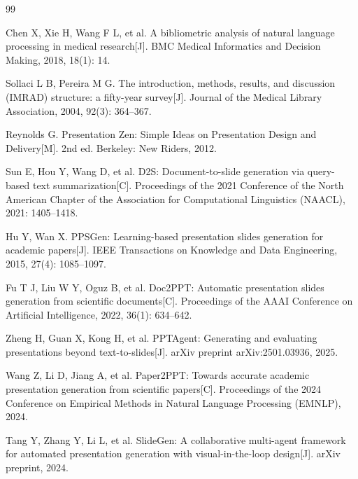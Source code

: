 
\begin{thebibliography}{99}

    Chen X, Xie H, Wang F L, et al.
    A bibliometric analysis of natural language processing in medical research[J].
    BMC Medical Informatics and Decision Making, 2018, 18(1): 14.

    Sollaci L B, Pereira M G.
    The introduction, methods, results, and discussion (IMRAD) structure: a fifty-year survey[J].
    Journal of the Medical Library Association, 2004, 92(3): 364--367.

    Reynolds G.
    Presentation Zen: Simple Ideas on Presentation Design and Delivery[M].
    2nd ed. Berkeley: New Riders, 2012.

    Sun E, Hou Y, Wang D, et al.
    D2S: Document-to-slide generation via query-based text summarization[C].
    Proceedings of the 2021 Conference of the North American Chapter of the Association for Computational Linguistics (NAACL), 2021: 1405--1418.

    Hu Y, Wan X.
    PPSGen: Learning-based presentation slides generation for academic papers[J].
    IEEE Transactions on Knowledge and Data Engineering, 2015, 27(4): 1085--1097.

    Fu T J, Liu W Y, Oguz B, et al.
    Doc2PPT: Automatic presentation slides generation from scientific documents[C].
    Proceedings of the AAAI Conference on Artificial Intelligence, 2022, 36(1): 634--642.

    Zheng H, Guan X, Kong H, et al.
    PPTAgent: Generating and evaluating presentations beyond text-to-slides[J].
    arXiv preprint arXiv:2501.03936, 2025.

    Wang Z, Li D, Jiang A, et al.
    Paper2PPT: Towards accurate academic presentation generation from scientific papers[C].
    Proceedings of the 2024 Conference on Empirical Methods in Natural Language Processing (EMNLP), 2024.

    Tang Y, Zhang Y, Li L, et al.
    SlideGen: A collaborative multi-agent framework for automated presentation generation with visual-in-the-loop design[J].
    arXiv preprint, 2024.


\end{thebibliography}
